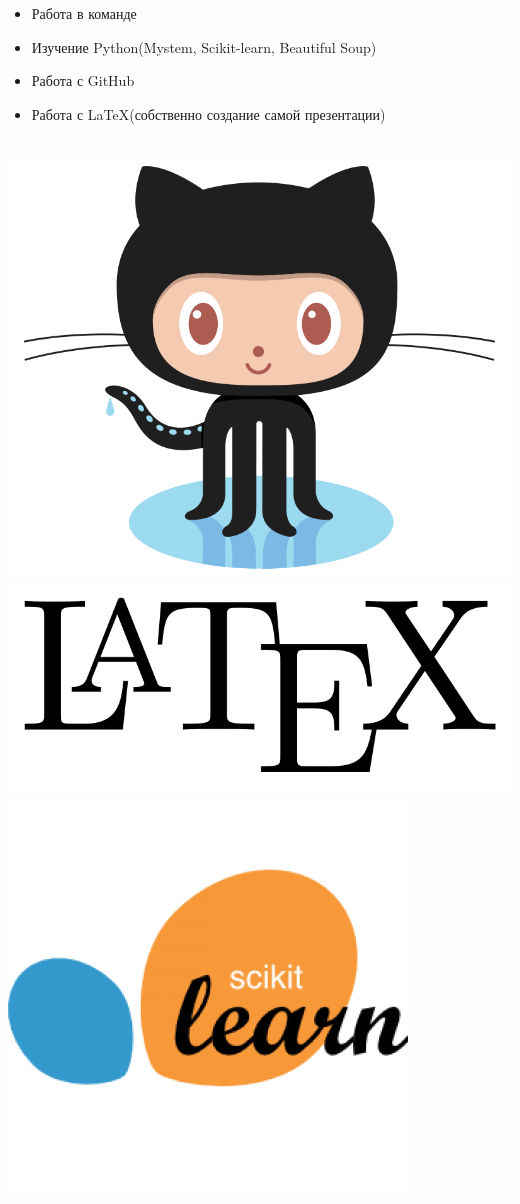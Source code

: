 \documentclass[t]{beamer}
\begin{document}
	
	\begin{frame}
		\frametitle{\insertsection}
		\begin{itemize}
			\item{Работа в команде}
			\item{Изучение Python(Mystem, Scikit-learn, Beautiful Soup)}
			\item{Работа с GitHub}
			\item{Работа с \LaTeX (собственно создание самой презентации)}
		\end{itemize}
		~~~~~~~~~
		\includegraphics[scale = 0.08]{images/git_hub.png}
		\includegraphics[scale = 0.08]{images/latex-logo.png}
		\includegraphics[scale = 0.2]{images/scikit_learn.png}
	\end{frame}
	
\end{document}
